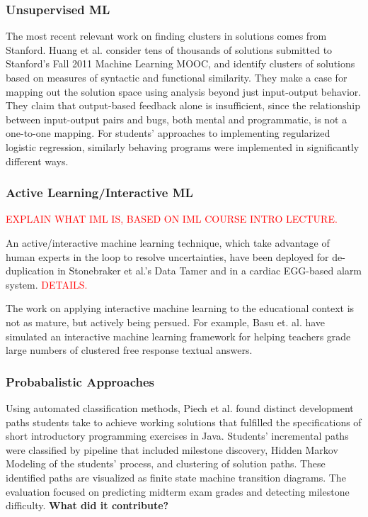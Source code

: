 \documentclass[12pt]{article}
\begin{document}
\subsubsection{Unsupervised ML}

The most recent relevant work on finding clusters in solutions comes from Stanford. Huang et al. \cite{MOOCshop} consider tens of thousands of solutions submitted to Stanford's Fall 2011 Machine Learning MOOC, and identify clusters of solutions based on measures of syntactic and functional similarity. They make a case for mapping out the solution space using analysis beyond just input-output behavior. They claim that output-based feedback alone is insufficient, since the relationship between input-output pairs and bugs, both mental and programmatic, is not a one-to-one mapping.  For students' approaches to implementing regularized logistic regression, similarly behaving programs were implemented in significantly different ways. 

\subsubsection{Active Learning/Interactive ML}

\textcolor{red}{EXPLAIN WHAT IML IS, BASED ON IML COURSE INTRO LECTURE.}

An active/interactive machine learning technique, which take advantage of human experts in the loop to resolve uncertainties, have been deployed for de-duplication in Stonebraker et al.'s Data Tamer \cite{stonebraker2013data} and in a cardiac EGG-based alarm system\cite{JWiensNIPS}. \textcolor{red}{DETAILS.} 

The work on applying interactive machine learning to the educational context is not as mature, but actively being persued. For example, Basu et. al. \cite{basupowergrading} have simulated an interactive machine learning framework for helping teachers grade large numbers of clustered free response textual answers.

\subsubsection{Probabalistic Approaches}

Using automated classification methods, Piech et al. \cite{Piech} found distinct development paths students take to achieve working solutions that fulfilled the specifications of short introductory programming exercises in Java. Students' incremental paths were classified by pipeline that included milestone discovery, Hidden Markov Modeling of the students' process, and clustering of solution paths. These identified paths are visualized as finite state machine transition diagrams. The evaluation focused on predicting midterm exam grades and detecting milestone difficulty. \textbf{What did it contribute?}
\end{document}
